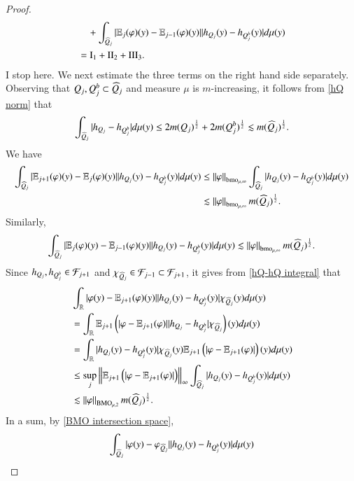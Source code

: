 \documentclass[leqno]{amsart}
\begin{document}
\begin{proof}
\begin{align*}
&\quad+\int_{\widehat{Q}_{j}}|\mathbb E_{j}(\varphi)(y)-\mathbb E_{j-1}(\varphi)(y)||h_{Q_{j}}(y)-h_{Q_{j}^{b}}(y)|d\mu(y)\\
&=\mathrm{I}_1+\mathrm{II}_2+\mathrm{III}_3.
\end{align*}
{\color{red}I stop here.}
We next estimate the three terms on the right hand side separately.
Observing that $Q_{j},Q_{j}^{b}\subset \widehat{Q}_{j}$ and measure $\mu$ is $m$-increasing, it follows from \eqref{hQ norm} that 
\begin{align}\label{hQ-hQ integral}
\int_{\widehat{Q}_{j}}|h_{Q_{j}}-h_{Q_{j}^{b}}|d\mu(y)
\leq2m(Q_{j})^{\frac{1}{2}}+2m(Q_{j}^{b})^{\frac{1}{2}}
\lesssim m(\widehat{Q}_{j})^{\frac{1}{2}}.
\end{align}
We have
\begin{align*}
\int_{\widehat{Q}_{j}}|\mathbb E_{j+1}(\varphi)(y)-\mathbb E_{j}(\varphi)(y)||h_{Q_{j}}(y)-h_{Q_{j}^{b}}(y)|d\mu(y)
&\leq\left\| \varphi \right\|_{{\rm bmo}_{\mu,\infty}}\int_{\widehat{Q}_{j}}|h_{Q_{j}}(y)-h_{Q_{j}^{b}}(y)|d\mu(y)\\
&\lesssim\left\| \varphi \right\|_{{\rm bmo}_{\mu,\infty}}m(\widehat{Q}_{j})^{\frac{1}{2}}.
\end{align*}
Similarly,
\begin{align*}
\int_{\widehat{Q}_{j}}|\mathbb E_{j}(\varphi)(y)-\mathbb E_{j-1}(\varphi)(y)||h_{Q_{j}}(y)-h_{Q_{j}^{b}}(y)|d\mu(y)
\lesssim\left\| \varphi \right\|_{{\rm bmo}_{\mu,\infty}}m(\widehat{Q}_{j})^{\frac{1}{2}}.
\end{align*}
Since $h_{Q_{j}},h_{Q_{j}^{b}}\in{\mathcal F}_{j+1}$ and $\chi_{\widehat{Q}_{j}}\in{\mathcal F}_{j-1}\subset{\mathcal F}_{j+1}$, it gives from \eqref{hQ-hQ integral} that
\begin{align*}
&\int_{{\mathbb R}}|\varphi(y)-\mathbb E_{j+1}(\varphi)(y)||h_{Q_{j}}(y)-h_{Q_{j}^{b}}(y)|\chi_{\widehat{Q}_{j}}(y)d\mu(y)\\
&=\int_{{\mathbb R}}\mathbb E_{j+1}\left(|\varphi-\mathbb E_{j+1}(\varphi)||h_{Q_{j}}-h_{Q_{j}^{b}}|\chi_{\widehat{Q}_{j}}\right)(y)d\mu(y)\\
&=\int_{{\mathbb R}}|h_{Q_{j}}(y)-h_{Q_{j}^{b}}(y)|\chi_{\widehat{Q}_{j}}(y)\mathbb E_{j+1}\left(|\varphi-\mathbb E_{j+1}(\varphi)|\right)(y)d\mu(y)\\
&\leq\sup_{j}\left\| \mathbb E_{j+1}\left(|\varphi-\mathbb E_{j+1}(\varphi)|\right) \right\|_{\infty}\int_{\widehat{Q}_{j}}|h_{Q_{j}}(y)-h_{Q_{j}^{b}}(y)|d\mu(y)\\
&\lesssim\left\| \varphi \right\|_{{\rm BMO}_{\mu,2}}m(\widehat{Q}_{j})^{\frac{1}{2}}.
\end{align*}
In a sum, by \eqref{BMO intersection space},
\begin{align*}%
\int_{\wh{Q}_{j}}|\varphi(y)-\varphi_{\wh{Q}_{j}}||h_{Q_{j}}(y)-h_{Q_{j}^{b}}(y)|d\mu(y)

\end{align*}
\end{proof}
\end{document}
